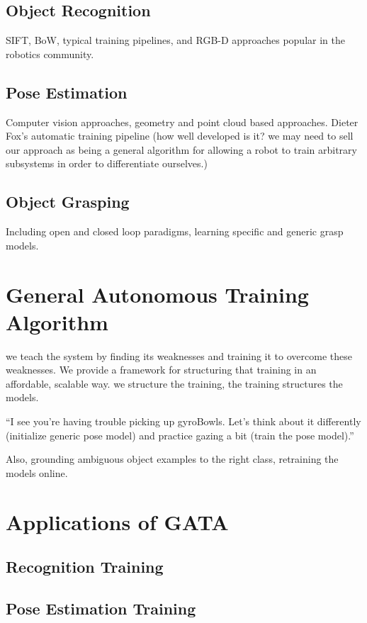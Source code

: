 \documentclass[conference]{IEEEtran}
\begin{document}
\subsection{Object Recognition}
SIFT, BoW, typical training pipelines, and RGB-D approaches popular in the robotics
community. 
 
\subsection{Pose Estimation}
Computer vision approaches, geometry and point cloud based approaches. Dieter Fox's automatic
training pipeline (how well developed is it? we may need to sell our approach as being a 
general algorithm for allowing a robot to train arbitrary subsystems in order to differentiate 
ourselves.)

\subsection{Object Grasping}
Including open and closed loop paradigms, learning specific and generic grasp models.

\section{General Autonomous Training Algorithm}
we teach the system by finding its weaknesses and training it to overcome these 
weaknesses. We provide a framework for structuring that training in an affordable, 
scalable way.  we structure the training, the training structures the models.

``I see you're having trouble picking up gyroBowls. Let’s think about it differently 
(initialize generic pose model) and practice gazing a bit (train the pose model).''

Also, grounding ambiguous object examples to the right class, retraining the models online.

\section{Applications of GATA}

\subsection{Recognition Training}

\subsection{Pose Estimation Training}
\end{document}
